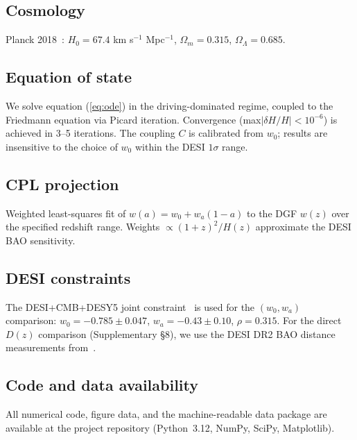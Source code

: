 \documentclass[12pt,a4paper]{article}
\begin{document}
\subsection*{Cosmology}
Planck 2018~\cite{planck2018}: $H_0=67.4$ km s$^{-1}$ Mpc$^{-1}$, $\Omega_m=0.315$, $\Omega_\Lambda=0.685$.

\subsection*{Equation of state}
We solve equation (\ref{eq:ode}) in the driving-dominated regime, coupled to the Friedmann equation via Picard iteration. Convergence (max$|\delta H/H|<10^{-6}$) is achieved in 3--5 iterations. The coupling $C$ is calibrated from $w_0$; results are insensitive to the choice of $w_0$ within the DESI $1\sigma$ range.

\subsection*{CPL projection}
Weighted least-squares fit of $w(a)=w_0+w_a(1-a)$ to the DGF $w(z)$ over the specified redshift range. Weights $\propto(1+z)^2/H(z)$ approximate the DESI BAO sensitivity.

\subsection*{DESI constraints}
The DESI+CMB+DESY5 joint constraint~\cite{zhang2026} is used for the $(w_0,w_a)$ comparison: $w_0=-0.785\pm0.047$, $w_a=-0.43\pm0.10$, $\rho=0.315$. For the direct $D(z)$ comparison (Supplementary \S8), we use the DESI DR2 BAO distance measurements from~\cite{desi2025}.

\subsection*{Code and data availability}
All numerical code, figure data, and the machine-readable data package are available at the project repository (Python~3.12, NumPy, SciPy, Matplotlib).
\end{document}
